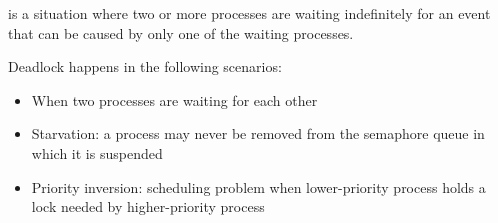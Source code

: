  is a situation where two or more processes are waiting indefinitely for an event that can be caused by only one of the waiting processes.

Deadlock happens in the following scenarios:
\begin{itemize}
    \item When two processes are waiting for each other
    \item Starvation: a process may never be removed from the semaphore queue in which it is suspended
    \item Priority inversion: scheduling problem when lower-priority process holds a lock needed by higher-priority process
\end{itemize}

